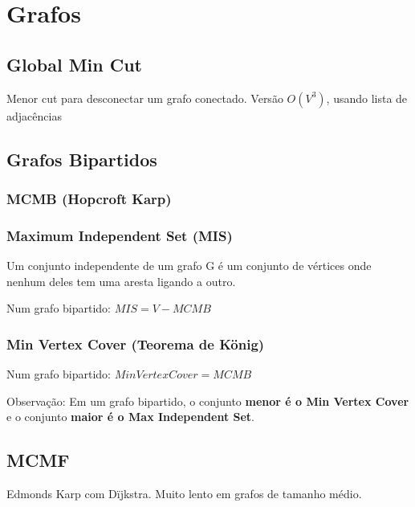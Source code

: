 \section{Grafos}

\subsection{Global Min Cut}
Menor cut para desconectar um grafo conectado. Vers\~{a}o $O(V^3)$, usando lista de adjac\^{e}ncias
\divisor

\subsection{Grafos Bipartidos}

\subsubsection{MCMB (Hopcroft Karp)}
\divisor

\subsubsection{Maximum Independent Set (MIS)}
Um conjunto independente de um grafo G é um conjunto de vértices onde nenhum deles tem uma aresta ligando a outro.

Num grafo bipartido: $MIS = V - MCMB$
\divisor

\subsubsection{Min Vertex Cover (Teorema de König)}
Num grafo bipartido: $Min Vertex Cover = MCMB$

Observação: Em um grafo bipartido, o conjunto \textbf{menor é o Min Vertex Cover} e o conjunto \textbf{maior é o Max Independent Set}.
\divisor

\subsection{MCMF}
Edmonds Karp com D\"{i}jkstra. Muito lento em grafos de tamanho m\'{e}dio.
\divisor

